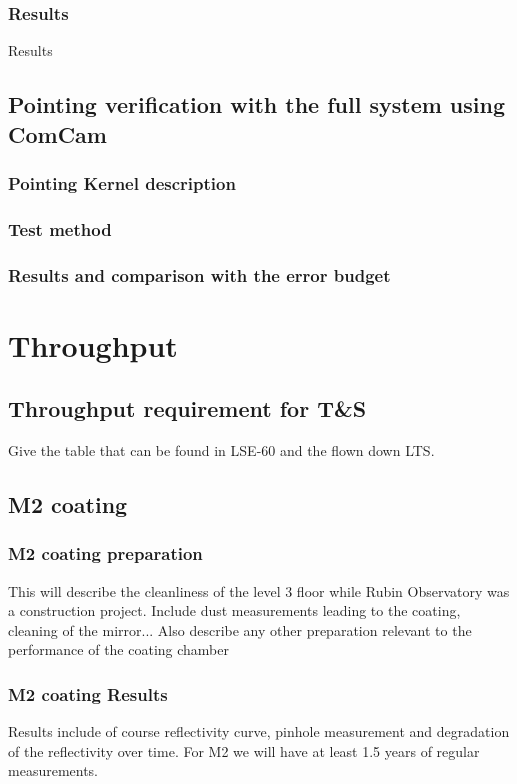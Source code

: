 \subsubsection{Results}
Results 

\subsection{Pointing verification with the full system using ComCam}
\subsubsection{Pointing Kernel description}
\subsubsection{Test method}
\subsubsection{Results and comparison with the error budget}

\section{Throughput}
\subsection{ Throughput requirement for T\&S}
Give the table that can be found in LSE-60 and the flown down LTS.
\subsection{M2 coating}
\subsubsection{M2 coating preparation}
This will describe the cleanliness of the level 3 floor while Rubin Observatory was a construction project. Include dust measurements leading to the coating, cleaning of the mirror...
Also describe any other preparation relevant to the performance of the coating chamber
\subsubsection{M2 coating Results}
Results  include of course reflectivity curve, pinhole measurement and degradation of the reflectivity over time. For M2 we will have at least 1.5 years of regular measurements. 
